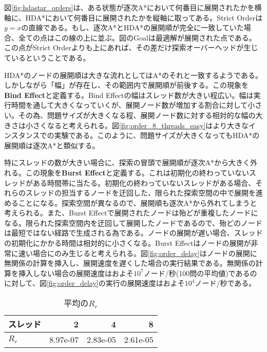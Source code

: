 \documentclass[uplatex]{jsarticle}
\begin{document}
図\ref{fig:hdastar_orders}は、ある状態が逐次A*において何番目に展開されたかを横軸に、HDA*において何番目に展開されたかを縦軸に取ってある。Strict Orderは$y = x$の直線である。もし、逐次A*とHDA*の展開順が完全に一致していた場合、全ての点はこの線の上に並ぶ。図のGoalは最適解が展開された点である。この点がStrict Orderよりも上にあれば、その差だけ探索オーバーヘッドが生じているということである。

HDA*のノードの展開順は大きな流れとしてはA*のそれと一致するようである。しかしながら「幅」が存在し、その範囲内で展開順が前後する。この現象を\textbf{Bind Effect}と定義する。Bind Effectの幅はスレッド数が大きい程広い。幅は実行時間を通して大きくなっていくが、展開ノード数が増加する割合に対して小さい。その為、問題サイズが大きくなる程、展開ノード数に対する相対的な幅の大きさは小さくなると考えられる。図\ref{fig:order_8_threads_easy}はより大きなインスタンスでの実験である。このように、問題サイズが大きくなってもHDA*の展開順は逐次A*と類似する。

特にスレッドの数が大きい場合に、探索の冒頭で展開順が逐次A*から大きく外れる。この現象を\textbf{Burst Effect}と定義する。これは初期化の終わっていないスレッドがある時間帯に当たる。初期化の終わっていないスレッドがある場合、それらのスレッドの担当するノードを迂回した、限られた探索空間の中で展開を進めることになる。探索空間が異なるので、展開順も逐次A*から外れてしまうと考えられる。また、Burst Effectで展開されたノードは殆どが重複したノードになる。限られた探索空間内を迂回して展開したノードであるので、殆どのノードは最短ではない経路で生成される為である。ノードの展開が遅い場合、スレッドの初期化にかかる時間は相対的に小さくなる。Burst Effectはノードの展開が非常に速い場合にのみ生じると考えられる。図\ref{fig:order_delay}はノードの展開に無関係の計算を挿入し、展開速度を遅くした場合の実行結果である。無関係の計算を挿入しない場合の展開速度はおよそ$10^7$ノード/秒(100問の平均値)であるのに対して、図\ref{fig:order_delay}の実行の展開速度はおよそ$10^4$ノード/秒である。


\begin{table}[h]
	\centering
	\begin{tabular}{lrrr} \hline
		スレッド  & 2 & 4 & 8 \\ \hline
		$R_{r}$ & 8.97e-07 & 2.83e-05 & 2.61e-05 \\ \hline
	\end{tabular}
	\caption{平均の$R_{r}$}
	\label{hdastar_duplication}
\end{table}
\end{document}
